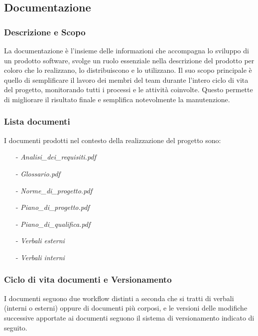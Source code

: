\subsection{Documentazione}

\subsubsection{Descrizione e Scopo}
La documentazione è l'insieme delle informazioni che accompagna lo sviluppo di un prodotto software, svolge un ruolo essenziale nella descrizione del prodotto per coloro che lo realizzano, lo distribuiscono e lo utilizzano.
Il suo scopo principale è quello di semplificare il lavoro dei membri del team durante l'intero ciclo di vita del progetto, monitorando tutti i processi e le attività coinvolte. Questo permette di migliorare il risultato finale e semplifica notevolmente la manutenzione.\\

\subsubsection{Lista documenti}
I documenti prodotti nel contesto della realizzazione del progetto sono:
\begin{itemize}
    \item [-] \textit{Analisi\_dei\_requisiti.pdf}
    \item [-] \textit{Glossario.pdf}
    \item [-] \textit{Norme\_di\_progetto.pdf}
    \item [-] \textit{Piano\_di\_progetto.pdf}
    \item [-] \textit{Piano\_di\_qualifica.pdf}
    \item [-] \textit{Verbali esterni}
    \item [-] \textit{Verbali interni}
\end{itemize}

\subsubsection{Ciclo di vita documenti e Versionamento}
I documenti seguono due workflow distinti a seconda che si tratti di verbali (interni o esterni) oppure di documenti più corposi, e le versioni delle modifiche successive apportate ai documenti seguono il sistema di versionamento indicato di seguito.\\

